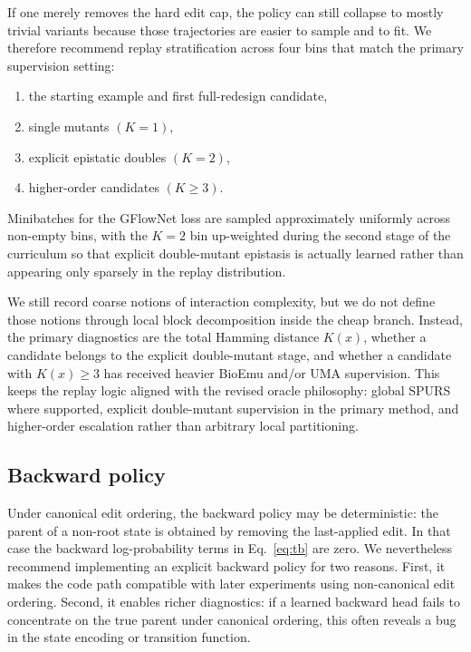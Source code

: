 \documentclass[11pt]{article}
\begin{document}
	If one merely removes the hard edit cap, the policy can still collapse to mostly trivial variants because those trajectories are easier to sample and to fit. We therefore recommend replay stratification across four bins that match the primary supervision setting:
	\begin{enumerate}[leftmargin=1.5em]
		\item the starting example and first full-redesign candidate,
		\item single mutants $(K=1)$,
		\item explicit epistatic doubles $(K=2)$,
		\item higher-order candidates $(K\ge 3)$.
	\end{enumerate}
	Minibatches for the GFlowNet loss are sampled approximately uniformly across non-empty bins, with the $K=2$ bin up-weighted during the second stage of the curriculum so that explicit double-mutant epistasis is actually learned rather than appearing only sparsely in the replay distribution.
	
	We still record coarse notions of interaction complexity, but we do not define those notions through local block decomposition inside the cheap branch. Instead, the primary diagnostics are the total Hamming distance $K(x)$, whether a candidate belongs to the explicit double-mutant stage, and whether a candidate with $K(x)\ge 3$ has received heavier BioEmu and/or UMA supervision. This keeps the replay logic aligned with the revised oracle philosophy: global SPURS where supported, explicit double-mutant supervision in the primary method, and higher-order escalation rather than arbitrary local partitioning.
	
	
	\subsection{Backward policy}
	
	Under canonical edit ordering, the backward policy may be deterministic: the parent of a non-root state is obtained by removing the last-applied edit. In that case the backward log-probability terms in Eq.~\eqref{eq:tb} are zero. We nevertheless recommend implementing an explicit backward policy for two reasons. First, it makes the code path compatible with later experiments using non-canonical edit ordering. Second, it enables richer diagnostics: if a learned backward head fails to concentrate on the true parent under canonical ordering, this often reveals a bug in the state encoding or transition function.
	
\end{document}
